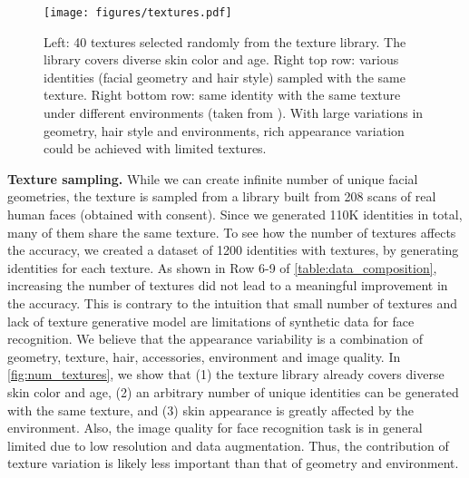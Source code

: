 \documentclass[10pt,twocolumn,letterpaper]{article}
\begin{document}
\begin{figure}[t]
\begin{center}
\texttt{[image: figures/textures.pdf]}
\end{center}
\caption{Left: 40 textures selected randomly from the texture library. The library covers diverse skin color and age. Right top row: various identities (facial geometry and hair style) sampled with the same texture. Right bottom row: same identity with the same texture under different environments (taken from \cite{2021_FakeItMakeIt}). With large variations in geometry, hair style and environments, rich appearance variation could be achieved with limited textures.
}
\label{fig:num_textures}
\end{figure}

\noindent
\textbf{Texture sampling.} 
While we can create infinite number of unique facial geometries, the texture is sampled from a library built from 208 scans of real human faces (obtained with consent). 
Since we generated 110K identities in total, many of them share the same texture. 
To see how the number of textures affects the accuracy, we created a dataset of 1200 identities with  textures, by generating  identities for each texture. 
As shown in Row 6-9 of \autoref{table:data_composition}, increasing the number of textures did not lead to a meaningful improvement in the accuracy.
This is contrary to the intuition that small number of textures and lack of texture generative model are limitations of synthetic data for face recognition. 
We believe that the appearance variability is a combination of geometry, texture, hair, accessories, environment and image quality.
In \autoref{fig:num_textures}, we show that (1) the texture library already covers diverse skin color and age, (2) an arbitrary number of unique identities can be generated with the same texture, and (3) skin appearance is greatly affected by the environment.
Also, the image quality for face recognition task is in general limited due to low resolution and data augmentation. 
Thus, the contribution of texture variation is likely less important than that of geometry and environment.
\end{document}
